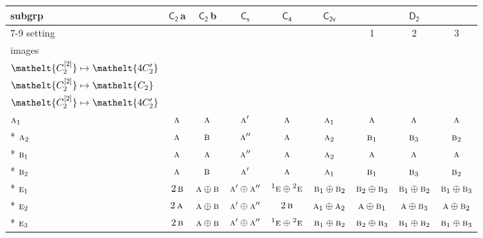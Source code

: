\documentclass[10pt,a4paper]{article}
\numberwithin{equation}{section}
\newcommand{\eltfont}[1]{{\let\sigma\eltsigma\mathelt{#1}}}
\newcommand{\grp}[1]{\mathsf{#1}}
\newcommand{\irr}[1]{\text{\normalfont\scshape #1}}
\newcommand{\conjpair}[1]{{}^{#1}}
\newcommand{\cls}[1]{\eltfont{#1}}
\newcommand{\clsletter}[1]{\,{\scriptsize\color{black!55}#1}}
\newcommand{\genidx}[2]{#1^{[\mathrm{#2}]}}
\begin{document}
{\small\begin{longtable}{@{}lcccccccc@{}}\toprule
subgrp & \href{C2.pdf}{$\grp{C_{2}}$}\clsletter{a} & \href{C2.pdf}{$\grp{C_{2}}$}\clsletter{b} & \href{C1v.pdf}{$\grp{C_{s}}$} & \href{C4.pdf}{$\grp{C_{4}}$} & \href{C2v.pdf}{$\grp{C_{2v}}$} & \multicolumn{3}{c}{\href{D2.pdf}{$\grp{D_{2}}$}}\\\cmidrule(lr){7-9}
setting &  &  &  &  &  & 1 & 2 & 3\\
images &  &  &  &  &  & {\scriptsize\begin{tabular}[t]{@{}c@{}}$\cls{\genidx{C_{2}}{1}} \mapsto \cls{C_{2}}$\\$\cls{\genidx{C_{2}}{2}} \mapsto \cls{4C_{2}'}$\end{tabular}} & {\scriptsize\begin{tabular}[t]{@{}c@{}}$\cls{\genidx{C_{2}}{1}} \mapsto \cls{4C_{2}'}$\\$\cls{\genidx{C_{2}}{2}} \mapsto \cls{C_{2}}$\end{tabular}} & {\scriptsize\begin{tabular}[t]{@{}c@{}}$\cls{\genidx{C_{2}}{1}} \mapsto \cls{4C_{2}'}$\\$\cls{\genidx{C_{2}}{2}} \mapsto \cls{4C_{2}'}$\end{tabular}}\\\midrule\endhead
\bottomrule\endfoot\endlastfoot
$\irr{a}_{1}$ & $\irr{a}$ & $\irr{a}$ & $\irr{a}'$ & $\irr{a}$ & $\irr{a}_{1}$ & $\irr{a}$ & $\irr{a}$ & $\irr{a}$\\*
$\irr{a}_{2}$ & $\irr{a}$ & $\irr{b}$ & $\irr{a}''$ & $\irr{a}$ & $\irr{a}_{2}$ & $\irr{b}_{1}$ & $\irr{b}_{3}$ & $\irr{b}_{2}$\\*
$\irr{b}_{1}$ & $\irr{a}$ & $\irr{a}$ & $\irr{a}''$ & $\irr{a}$ & $\irr{a}_{2}$ & $\irr{a}$ & $\irr{a}$ & $\irr{a}$\\*
$\irr{b}_{2}$ & $\irr{a}$ & $\irr{b}$ & $\irr{a}'$ & $\irr{a}$ & $\irr{a}_{1}$ & $\irr{b}_{1}$ & $\irr{b}_{3}$ & $\irr{b}_{2}$\\*
$\irr{e}_{1}$ & $2\,\irr{b}$ & $\irr{a}\oplus \irr{b}$ & $\irr{a}'\oplus \irr{a}''$ & $\conjpair{1}\irr{e}\oplus \conjpair{2}\irr{e}$ & $\irr{b}_{1}\oplus \irr{b}_{2}$ & $\irr{b}_{2}\oplus \irr{b}_{3}$ & $\irr{b}_{1}\oplus \irr{b}_{2}$ & $\irr{b}_{1}\oplus \irr{b}_{3}$\\*
$\irr{e}_{2}$ & $2\,\irr{a}$ & $\irr{a}\oplus \irr{b}$ & $\irr{a}'\oplus \irr{a}''$ & $2\,\irr{b}$ & $\irr{a}_{1}\oplus \irr{a}_{2}$ & $\irr{a}\oplus \irr{b}_{1}$ & $\irr{a}\oplus \irr{b}_{3}$ & $\irr{a}\oplus \irr{b}_{2}$\\*
$\irr{e}_{3}$ & $2\,\irr{b}$ & $\irr{a}\oplus \irr{b}$ & $\irr{a}'\oplus \irr{a}''$ & $\conjpair{1}\irr{e}\oplus \conjpair{2}\irr{e}$ & $\irr{b}_{1}\oplus \irr{b}_{2}$ & $\irr{b}_{2}\oplus \irr{b}_{3}$ & $\irr{b}_{1}\oplus \irr{b}_{2}$ & $\irr{b}_{1}\oplus \irr{b}_{3}$\\
\bottomrule\end{longtable}}
\end{document}
